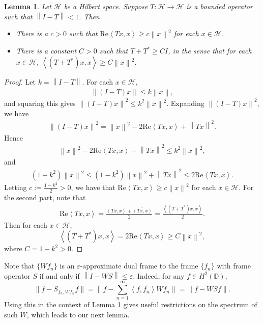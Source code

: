 \documentclass{amsart}
\newtheorem{lem}[thm]{Lemma}
\theoremstyle{definition}
\theoremstyle{remark}
\numberwithin{equation}{section}
\newcommand{\ip}[2]{\left\langle {#1} , {#2} \right\rangle} %
\newcommand{\norm}[1]{\left\lVert #1 \right\rVert} %
\begin{document}
\begin{lem}\label{invert_lem}
    Let $\mathcal{H}$ be a Hilbert space. Suppose $T:\mathcal{H}\to\mathcal{H}$ is a bounded operator such that $\norm{I-T}<1$. Then 
    \begin{itemize}
        \item[1.] There is a $c>0$ such that $\text{Re} \ip{Tx}{x} \geq c\norm{x}^{2}$ for each $x\in\mathcal{H}$. 
        \item[2.] There is a constant $C>0$ such that $T+T^{*}\geq CI$, in the sense that for each $x\in\mathcal{H}$, $\ip{(T+T^{*})x}{x} \geq C\norm{x}^{2}$.
    \end{itemize}
\end{lem}
\begin{proof}
    Let $k=\norm{I-T}$. For each $x\in\mathcal{H}$, 
    \begin{align*}
        \norm{(I-T)x}\leq k\norm{x},
    \end{align*}
    and squaring this gives $\norm{(I-T)x}^{2}\leq k^{2}\norm{x}^{2}$. Expanding $\norm{(I-T)x}^{2}$, we have 
    \begin{align*}
        \norm{(I-T)x}^{2}=\norm{x}^{2}-2\text{Re}\ip{Tx}{x}+\norm{Tx}^{2}.
    \end{align*}
  Hence 
    \begin{align*}
        \norm{x}^{2}-2\text{Re}\ip{Tx}{x}+\norm{Tx}^{2}\leq k^{2}\norm{x}^{2},
    \end{align*}
    and 
    \begin{align*}
        (1-k^{2})\norm{x}^{2}\leq(1-k^{2})\norm{x}^{2}+\norm{Tx}^{2}\leq 2\text{Re}\ip{Tx}{x}.
    \end{align*}
    Letting $c:=\frac{1-k^{2}}{2}>0$, we have that $\text{Re}\ip{Tx}{x}\geq c\norm{x}^{2}$ for each $x\in\mathcal{H}$.
    For the second part, note that 
    \begin{align*}
        \text{Re}\ip{Tx}{x}=\frac{\ip{Tx}{x}+\overline{\ip{Tx}{x}}}{2}=\frac{\ip{(T+T^{*})x}{x}}{2}. 
    \end{align*}
   Then for each $x\in\mathcal{H}$, 
   $$\ip{(T+T^{*})x}{x} = 2\text{Re}\ip{Tx}{x}\geq  C\norm{x}^2,$$
   where $C=1-k^{2}>0$.
\end{proof}


Note that $\{Wf_{n}\}$ is an $\varepsilon$-approximate dual frame to the frame $\{f_{n}\}$ with frame operator $S$ if and only if $\norm{I-WS}\leq \varepsilon$. Indeed, for any $f \in H^{2}(\mathbb{D})$,
\begin{equation*}
    \|f -   S_{f_n,Wf_n}f  \| = \|f -  \sum_{n=1}^{\infty}\ip{f}{f_{n}}Wf_{n}\| =  \|f -  WSf\|.
\end{equation*}
Using this in the context of Lemma \ref{invert_lem} gives useful restrictions on the spectrum of such $W$, which leads to our next lemma. 
\end{document}
